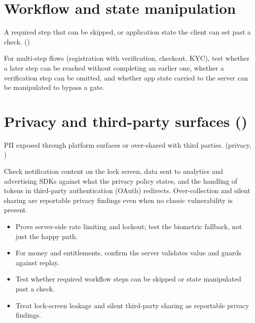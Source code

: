 \section{Workflow and state manipulation}
\begin{findingbox}
A required step that can be skipped, or application state the client can set past a check. ()
\end{findingbox}
For multi-step flows (registration with verification, checkout, KYC), test whether a later step can be reached without completing an earlier one, whether a verification step can be omitted, and whether app state carried to the server can be manipulated to bypass a gate.

\section{Privacy and third-party surfaces ()}
\begin{findingbox}
PII exposed through platform surfaces or over-shared with third parties. (privacy, )
\end{findingbox}
Check notification content on the lock screen, data sent to analytics and advertising SDKs against what the privacy policy states, and the handling of tokens in third-party authentication (OAuth) redirects. Over-collection and silent sharing are reportable privacy findings even when no classic vulnerability is present.

\begin{summarybox}
\begin{itemize}
\item Prove server-side rate limiting and lockout; test the biometric fallback, not just the happy path.
\item For money and entitlements, confirm the server validates value and guards against replay.
\item Test whether required workflow steps can be skipped or state manipulated past a check.
\item Treat lock-screen leakage and silent third-party sharing as reportable privacy findings.
\end{itemize}
\end{summarybox}
